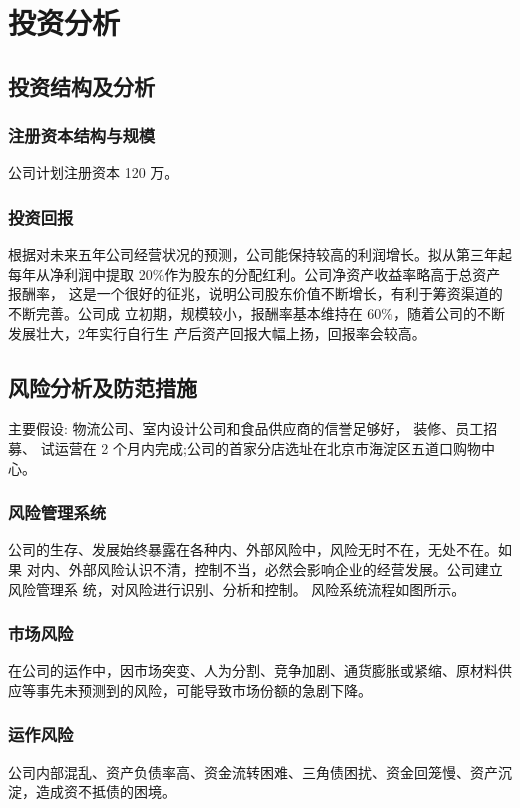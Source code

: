 \chapter{投资分析}
\section{投资结构及分析}
\subsection{注册资本结构与规模}
公司计划注册资本 120 万。

\subsection{投资回报}
根据对未来五年公司经营状况的预测，公司能保持较高的利润增长。拟从第三年起
每年从净利润中提取 20\%作为股东的分配红利。公司净资产收益率略高于总资产报酬率，
这是一个很好的征兆，说明公司股东价值不断增长，有利于筹资渠道的不断完善。公司成
立初期，规模较小，报酬率基本维持在 60\%，随着公司的不断发展壮大，2年实行自行生
产后资产回报大幅上扬，回报率会较高。

\section{风险分析及防范措施}
主要假设: 物流公司、室内设计公司和食品供应商的信誉足够好， 装修、员工招募、
试运营在 2 个月内完成;公司的首家分店选址在北京市海淀区五道口购物中心。

\subsection{风险管理系统}
公司的生存、发展始终暴露在各种内、外部风险中，风险无时不在，无处不在。如果
对内、外部风险认识不清，控制不当，必然会影响企业的经营发展。公司建立风险管理系
统，对风险进行识别、分析和控制。
风险系统流程如图所示。

\subsection{市场风险}
在公司的运作中，因市场突变、人为分割、竞争加剧、通货膨胀或紧缩、原材料供
应等事先未预测到的风险，可能导致市场份额的急剧下降。
\subsection{运作风险}
公司内部混乱、资产负债率高、资金流转困难、三角债困扰、资金回笼慢、资产沉
淀，造成资不抵债的困境。
